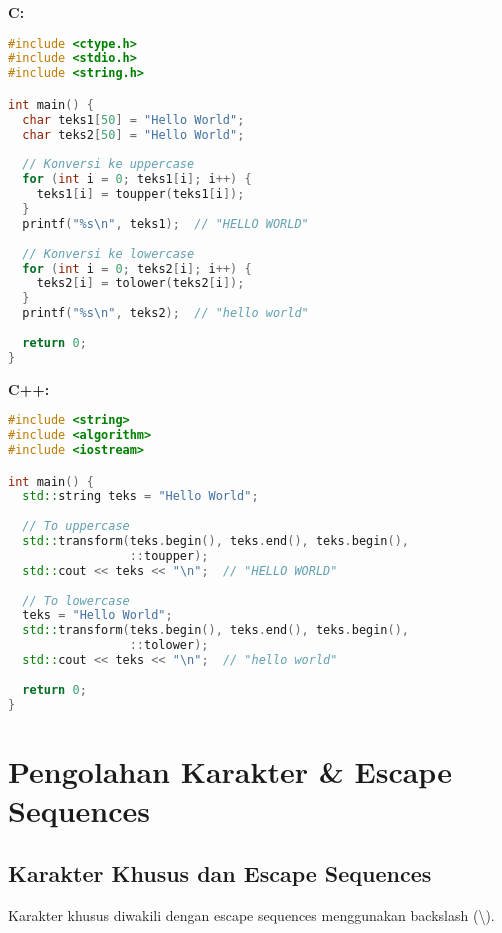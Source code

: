 \documentclass[../main.tex]{subfiles}
\begin{document}
\textbf{C:}
\begin{lstlisting}[language=C, caption={Case conversion di C}]
#include <ctype.h>
#include <stdio.h>
#include <string.h>

int main() {
  char teks1[50] = "Hello World";
  char teks2[50] = "Hello World";
  
  // Konversi ke uppercase
  for (int i = 0; teks1[i]; i++) {
    teks1[i] = toupper(teks1[i]);
  }
  printf("%s\n", teks1);  // "HELLO WORLD"
  
  // Konversi ke lowercase
  for (int i = 0; teks2[i]; i++) {
    teks2[i] = tolower(teks2[i]);
  }
  printf("%s\n", teks2);  // "hello world"
  
  return 0;
}
\end{lstlisting}

\textbf{C++:}
\begin{lstlisting}[language=C++, caption={Case conversion di C++}]
#include <string>
#include <algorithm>
#include <iostream>

int main() {
  std::string teks = "Hello World";
  
  // To uppercase
  std::transform(teks.begin(), teks.end(), teks.begin(), 
                 ::toupper);
  std::cout << teks << "\n";  // "HELLO WORLD"
  
  // To lowercase
  teks = "Hello World";
  std::transform(teks.begin(), teks.end(), teks.begin(), 
                 ::tolower);
  std::cout << teks << "\n";  // "hello world"
  
  return 0;
}
\end{lstlisting}

\section{Pengolahan Karakter \& Escape Sequences}

\subsection{Karakter Khusus dan Escape Sequences}

Karakter khusus diwakili dengan escape sequences menggunakan backslash (\textbackslash).
\end{document}
